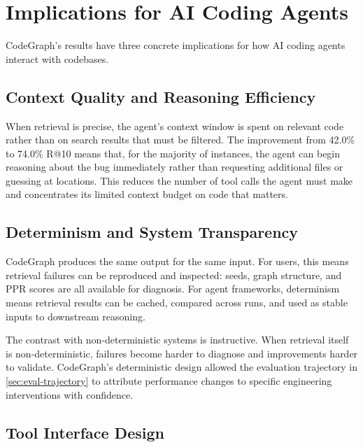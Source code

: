 \section{Implications for AI Coding Agents}
\label{sec:implications}

CodeGraph's results have three concrete implications for how AI coding agents interact with codebases.

\subsection{Context Quality and Reasoning Efficiency}

When retrieval is precise, the agent's context window is spent on relevant code rather than on search results that must be filtered. The improvement from 42.0\% to 74.0\% R@10 means that, for the majority of instances, the agent can begin reasoning about the bug immediately rather than requesting additional files or guessing at locations. This reduces the number of tool calls the agent must make and concentrates its limited context budget on code that matters.

\subsection{Determinism and System Transparency}

CodeGraph produces the same output for the same input. For users, this means retrieval failures can be reproduced and inspected: seeds, graph structure, and PPR scores are all available for diagnosis. For agent frameworks, determinism means retrieval results can be cached, compared across runs, and used as stable inputs to downstream reasoning.

The contrast with non-deterministic systems is instructive. When retrieval itself is non-deterministic, failures become harder to diagnose and improvements harder to validate. CodeGraph's deterministic design allowed the evaluation trajectory in \cref{sec:eval-trajectory} to attribute performance changes to specific engineering interventions with confidence.

\subsection{Tool Interface Design}

